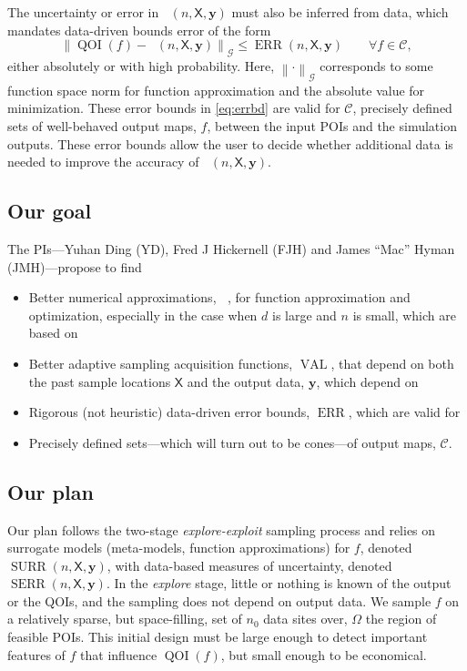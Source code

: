 \documentclass[11pt]{NSFamsart}
\DeclareMathOperator{\QOI}{QOI}
\DeclareMathOperator{\APP}{\widehat{\QOI}}
\DeclareMathOperator{\SURR}{SURR}
\DeclareMathOperator{\ERR}{ERR}
\DeclareMathOperator{\VAL}{VAL}
\DeclareMathOperator{\SURRERR}{SERR}
\newcommand{\mX}{\mathsf{X}}
\newcommand{\by}{{\boldsymbol{y}}}
\newcommand{\calc}{{\mathcal{C}}}
\newcommand{\calg}{{\mathcal{G}}}
\newcommand{\norm}[2][{}]{\ensuremath{\left \lVert #2 \right \rVert}_{#1}}
\newcommand{\bignorm}[2][{}]{\ensuremath{\bigl \lVert #2 \bigr \rVert}_{#1}}
\begin{document}
The uncertainty or error in $\APP(n,\mX,\by)$ must also be inferred from data, which mandates data-driven bounds error of the form 
\begin{equation} \label{eq:errbd}
    \bignorm[\calg]{\QOI(f) - \APP(n,\mX,\by)} \le \ERR(n,\mX,\by) \qquad \forall f \in \calc,
\end{equation}
either absolutely or with high probability.  Here, $\norm[\calg]{\cdot}$ corresponds to some function space norm for function approximation and the absolute value for minimization.  These error bounds in \eqref{eq:errbd} are valid for $\calc$,  precisely defined sets of well-behaved output maps, $f$, between the input POIs and the simulation outputs.  These error bounds allow the user to decide whether additional data is needed to improve the accuracy of $\APP(n,\mX,\by)$.


\subsection{Our goal}

The PIs---Yuhan Ding (YD), Fred J Hickernell (FJH) and James ``Mac'' Hyman (JMH)---propose to find
\begin{itemize}
    \item Better numerical approximations, $\APP$, for function approximation and optimization, especially in the case when $d$ is large and $n$ is small, which are based on
    \item Better adaptive sampling acquisition functions, $\VAL$, that depend on both the past sample locations $\mX$ and the output data, $\by$, which depend on
    \item Rigorous (not heuristic) data-driven error bounds, $\ERR$, which are valid for
    \item Precisely defined sets---which will turn out to be cones---of output maps, $\calc$.
\end{itemize}

\subsection{Our plan} \label{sec:OurPlan}

Our plan follows the two-stage \emph{explore-exploit} sampling process and relies on surrogate models (meta-models, function approximations) for $f$, denoted $\SURR(n,\mX,\by)$, with data-based measures of uncertainty, denoted $\SURRERR(n,\mX,\by)$.  In the \emph{explore} stage, little or nothing is known of the output or the QOIs, and the sampling does not depend on output data.  We sample $f$ on a relatively sparse, but space-filling, set of $n_0$ data sites over, $\Omega$ the region of feasible POIs.  This initial design must be large enough to detect important features of $f$ that influence $\QOI(f)$, but small enough to be economical. 
\end{document}
